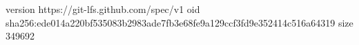 version https://git-lfs.github.com/spec/v1
oid sha256:ede014a220bf535083b2983ade7fb3e68fe9a129ccf3fd9e352414c516a64319
size 349692

